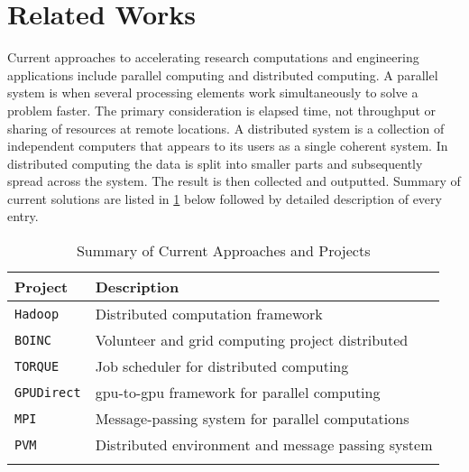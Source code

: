 \section{Related Works}

Current approaches to accelerating research computations and engineering
applications include parallel computing and distributed computing. A parallel
system is when several processing elements work simultaneously to solve a
problem faster. The primary consideration is elapsed time, not throughput or
sharing of resources at remote locations. A distributed system is a collection
of independent computers that appears to its users as a single coherent system.
In distributed computing the data is split into smaller parts and subsequently
spread across the system. The result is then collected and outputted. Summary
of current solutions are listed in \cref{tab:relatedProjects} below followed by
detailed description of every entry.\\

\begin{table}[htb]
\centering
\begin{tabular}{ll}
\toprule{}
\textbf{Project}   & \textbf{Description} \\
\midrule{}
\texttt{Hadoop}    & Distributed computation framework
                     \cite{website:Hadoop-Wiki} \cite{website:Apache-Hadoop}
                     \cite{shvachko2011apache}\\
\midrule{}
\texttt{BOINC}     & Volunteer and grid computing project distributed
                     \cite{anderson2004boinc} \\
\midrule{}
\texttt{TORQUE}    & Job scheduler for distributed computing
                     \cite{website:TORQUE-Resource-Manager} \\
\midrule{}
\texttt{GPUDirect} & \gls{gpu}-to-\gls{gpu} framework for parallel computing
                     \cite{website:YouTube} \\
\midrule{}
\texttt{MPI}       & Message-passing system for parallel computations
                     \cite{website:MPI-Tutorial} \cite{website:mpi-4-python} \\
\midrule{}
\texttt{PVM}       & Distributed environment and message passing system
                     \cite{website:Computer-Science-and-Division} \\
\bottomrule{}
\end{tabular}
\caption{Summary of Current Approaches and Projects}
\label{tab:relatedProjects}
\end{table}

